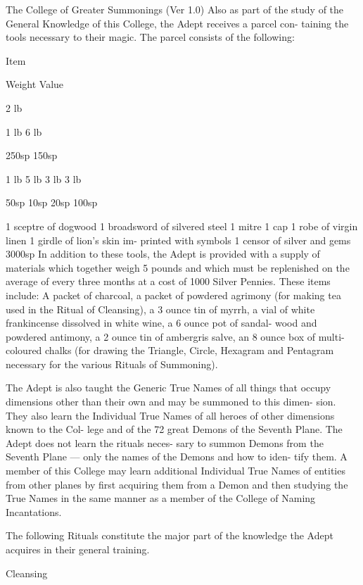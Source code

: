 \begin{Chapter}{The College of Greater Summonings (Ver 1.0)}
Also as part of the study of the General Knowledge 
of  this  College,  the  Adept  receives  a  parcel  con-
taining  the  tools  necessary  to  their  magic.  The 
parcel consists of the following: 

Item 

Weight  Value 

2 lb 

1 lb 
6 lb 

250sp 
150sp 

1 lb 
5 lb 
3 lb 
3 lb 

50sp 
10sp 
20sp 
100sp 

1 sceptre of dogwood 
1 broadsword of silvered 
steel 
1 mitre 
1 cap 
1 robe of virgin linen 
1 girdle of lion’s skin im-
printed with symbols 
1 censor of silver and gems 
3000sp 
In  addition  to  these  tools,  the  Adept  is  provided 
with a supply of materials which together weigh 5 
pounds  and  which  must  be  replenished  on  the 
average  of  every  three  months  at  a  cost  of  1000 
Silver  Pennies.  These  items  include:  A  packet  of 
charcoal,  a  packet  of  powdered  agrimony  (for 
making  tea  used  in  the  Ritual  of  Cleansing),  a  3 
ounce  tin  of  myrrh,  a  vial  of  white  frankincense 
dissolved  in  white  wine,  a  6  ounce  pot  of  sandal-
wood  and  powdered  antimony,  a  2  ounce  tin  of 
ambergris salve, an 8 ounce box of multi-coloured 
chalks (for drawing the Triangle, Circle, Hexagram 
and Pentagram necessary for the various Rituals of 
Summoning). 

The  Adept  is  also  taught  the  Generic  True  Names 
of  all  things  that  occupy  dimensions  other  than 
their  own  and  may  be  summoned  to  this  dimen-
sion. They also learn the Individual True Names of 
all  heroes  of  other  dimensions  known  to  the  Col-
lege  and  of  the  72  great  Demons  of  the  Seventh 
Plane.  The  Adept  does  not  learn  the  rituals  neces-
sary  to  summon  Demons  from  the  Seventh  Plane 
— only the names of the Demons and how to iden-
tify  them.  A  member  of  this  College  may  learn 
additional  Individual  True  Names  of  entities  from 
other planes by first acquiring them from a Demon 
and  then  studying  the  True  Names  in  the  same 
manner  as  a  member  of  the  College  of  Naming 
Incantations. 

The  following  Rituals  constitute  the  major  part  of 
the  knowledge  the  Adept  acquires  in  their  general 
training. 

\begin{ritual}[Q-1]{Cleansing }


\end{ritual}
\end{Chapter}
